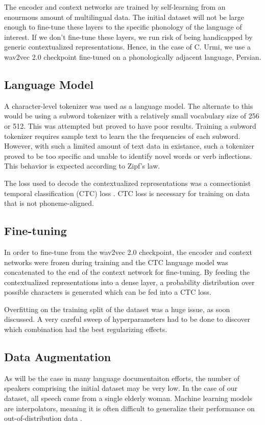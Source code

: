 \documentclass[letterpaper]{article} %
\begin{document}
The encoder and context networks are trained by self-learning from an enourmous amount of multilingual data. The initial dataset will not be large enough to fine-tune these layers to the specific phonology of the language of interest. If we don't fine-tune these layers, we run risk of being handicapped by generic contextualized representations. Hence, in the case of C. Urmi, we use a wav2vec 2.0 checkpoint fine-tuned on a phonologically adjacent language, Persian.

\subsection{Language Model}
A character-level tokenizer was used as a language model. The alternate to this would be using a subword tokenizer with a relatively small vocabulary size of 256 or 512. This was attempted but proved to have poor results. Training a subword tokenizer requires sample text to learn the the frequencies of each subword. However, with such a limited amount of text data in existance, such a tokenizer proved to be too specific and unable to identify novel words or verb inflections. This behavior is expected according to Zipf's law.

The loss used to decode the contextualized representations was a connectionist temporal classification (CTC) loss \cite{Graves2012}. CTC loss is necessary for training on data that is not phoneme-aligned.

\subsection{Fine-tuning}
In order to fine-tune from the wav2vec 2.0 checkpoint, the encoder and context networks were frozen during training and the CTC language model was concatenated to the end of the context network for fine-tuning. By feeding the contextualized representations into a dense layer, a probability distribution over possible characters is generated which can be fed into a CTC loss.

Overfitting on the training split of the dataset was a huge issue, as soon discussed. A very careful sweep of hyperparameters had to be done to discover which combination had the best regularizing effects. 

\subsection{Data Augmentation}

As will be the case in many language documentaiton efforts, the number of speakers comprising the initial dataset may be very low. In the case of our dataset, all speech came from a single elderly woman. Machine learning models are interpolators, meaning it is often difficult to generalize their performance on out-of-distribution data \cite{neyshabur2017exploring}.
\end{document}
